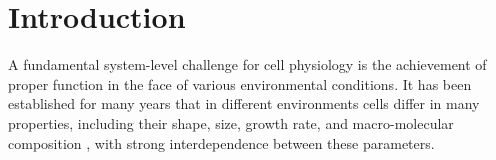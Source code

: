 \section{Introduction}
A fundamental system-level challenge for cell physiology is the achievement of proper function in the face of various environmental conditions.
It has been established for many years that in different environments cells differ in many properties, including their shape, size, growth rate, and macro-molecular composition \cite{Schaechter1958,Maaloe1969,Churchward1982,Pedersen1978a,ingraham1983growth,Bremer1987}, with strong interdependence between these parameters.